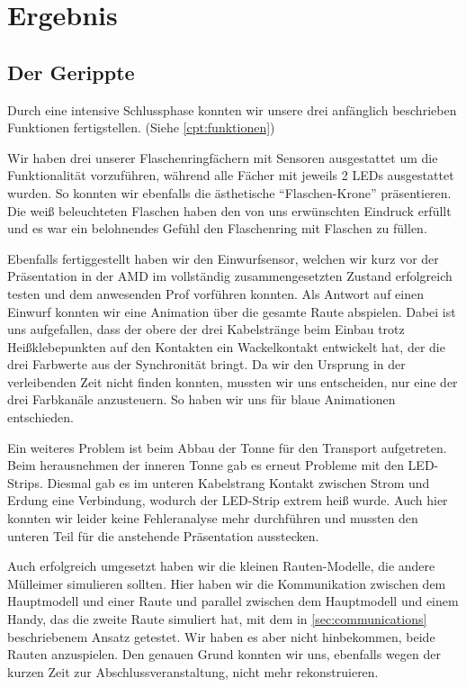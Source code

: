 \chapter{Ergebnis} \label{summary}

\section{Der Gerippte} 
    Durch eine intensive Schlussphase konnten wir unsere drei anfänglich beschrieben Funktionen fertigstellen. (Siehe \ref{cpt:funktionen})

    Wir haben drei unserer Flaschenringfächern mit Sensoren ausgestattet um die Funktionalität vorzuführen, während alle Fächer mit jeweils 2 LEDs ausgestattet wurden. So konnten wir ebenfalls die ästhetische \enquote{Flaschen-Krone} präsentieren. Die weiß beleuchteten Flaschen haben den von uns erwünschten Eindruck erfüllt und es war ein belohnendes Gefühl den Flaschenring mit Flaschen zu füllen.

    Ebenfalls fertiggestellt haben wir den Einwurfsensor, welchen wir kurz vor der Präsentation in der AMD im vollständig zusammengesetzten Zustand erfolgreich testen und dem anwesenden Prof vorführen konnten.
    Als Antwort auf einen Einwurf konnten wir eine Animation über die gesamte Raute abspielen. Dabei ist uns aufgefallen, dass der obere der drei Kabelstränge beim Einbau trotz Heißklebepunkten auf den Kontakten ein Wackelkontakt entwickelt hat, der die drei Farbwerte aus der Synchronität bringt. Da wir den Ursprung in der verleibenden Zeit nicht finden konnten, mussten wir uns entscheiden, nur eine der drei Farbkanäle anzusteuern. So haben wir uns für blaue Animationen entschieden.

    Ein weiteres Problem ist beim Abbau der Tonne für den Transport aufgetreten. Beim herausnehmen der inneren Tonne gab es erneut Probleme mit den LED-Strips. Diesmal gab es im unteren Kabelstrang Kontakt zwischen Strom und Erdung eine Verbindung, wodurch der LED-Strip extrem heiß wurde. Auch hier konnten wir leider keine Fehleranalyse mehr durchführen und mussten den unteren Teil für die anstehende Präsentation ausstecken.

    Auch erfolgreich umgesetzt haben wir die kleinen Rauten-Modelle, die andere Mülleimer simulieren sollten. Hier haben wir die Kommunikation zwischen dem Hauptmodell und einer Raute und parallel zwischen dem Hauptmodell und einem Handy, das die zweite Raute simuliert hat, mit dem in \ref{sec:communications} beschriebenem Ansatz getestet. Wir haben es aber nicht hinbekommen, beide Rauten anzuspielen. Den genauen Grund konnten wir uns, ebenfalls wegen der kurzen Zeit zur Abschlussveranstaltung, nicht mehr rekonstruieren.

